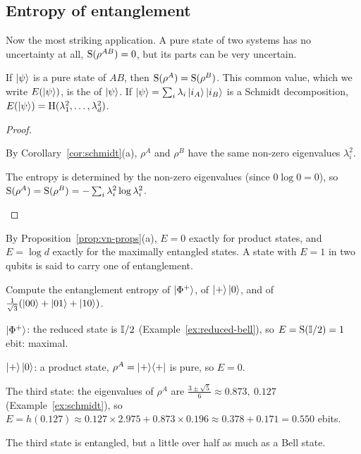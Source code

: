 \subsection{Entropy of entanglement}

Now the most striking application. A pure state of two systems has no uncertainty at all, $\mathrm{S}(\rho^{AB})=0$, but its parts can be very uncertain.

\begin{theorem}\label{thm:entanglement-entropy}
  If $\left|\psi\right\rangle$ is a pure state of $AB$, then $\mathrm{S}(\rho^A)=\mathrm{S}(\rho^B)$. This common value, which we write $E(\left|\psi\right\rangle)$, is the  of $\left|\psi\right\rangle$. If $\left|\psi\right\rangle=\sum_i\lambda_i\left|i_A\right\rangle\left|i_B\right\rangle$ is a Schmidt decomposition, $E(\left|\psi\right\rangle)=\mathrm{H}(\lambda_1^2,\dots,\lambda_d^2)$.
\end{theorem}
\begin{proof}
  \begin{steps}
    \item By Corollary~\ref{cor:schmidt}(a), $\rho^A$ and $\rho^B$ have the same non-zero eigenvalues $\lambda_i^2$.
    \item The entropy is determined by the non-zero eigenvalues (since $0\log0=0$), so $\mathrm{S}(\rho^A)=\mathrm{S}(\rho^B)=-\sum_i\lambda_i^2\log\lambda_i^2$. \qedhere
  \end{steps}
\end{proof}

By Proposition~\ref{prop:vn-props}(a), $E=0$ exactly for product states, and $E=\log d$ exactly for the maximally entangled states. A state with $E=1$ in two qubits is said to carry one  of entanglement.

\begin{example}\label{ex:ent-entropy}
  Compute the entanglement entropy of $\left|\Phi^+\right\rangle$, of $\left|+\right\rangle\left|0\right\rangle$, and of $\frac1{\sqrt3}(\left|00\right\rangle+\left|01\right\rangle+\left|10\right\rangle)$.
\end{example}
\begin{solution}
  \begin{steps}
    \item $\left|\Phi^+\right\rangle$: the reduced state is $\mathbb{I}/2$ (Example~\ref{ex:reduced-bell}), so $E=\mathrm{S}(\mathbb{I}/2)=1$ ebit: maximal.
    \item $\left|+\right\rangle\left|0\right\rangle$: a product state, $\rho^A=\left|+\right\rangle\!\left\langle+\right|$ is pure, so $E=0$.
    \item The third state: the eigenvalues of $\rho^A$ are $\tfrac{3\pm\sqrt5}{6}\approx0.873,\ 0.127$ (Example~\ref{ex:schmidt}), so $E=h(0.127)\approx0.127\times2.975+0.873\times0.196\approx0.378+0.171=0.550$ ebits.
  \end{steps}
  The third state is entangled, but a little over half as much as a Bell state.
\end{solution}

